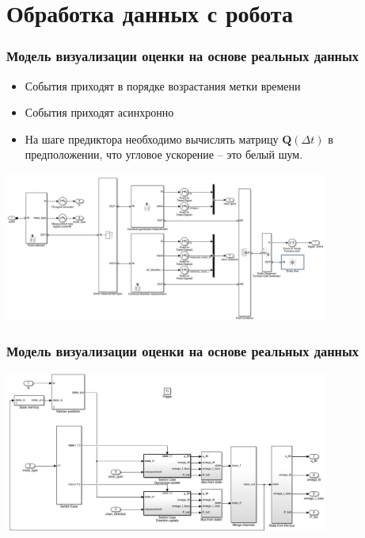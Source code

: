 \documentclass[utf8]{beamer}
\begin{document}
\section{Обработка данных с робота}
\begin{frame}
\frametitle{Модель визуализации оценки на основе реальных данных}
\begin{itemize}
    \item События приходят в порядке возрастания метки времени
    \item События приходят асинхронно
    \item На шаге предиктора необходимо вычислять матрицу
        $\mathbf{Q}\left(\Delta t\right)$ в предположении, что угловое
        ускорение -- это белый шум.
\end{itemize}
\begin{center}
    \includegraphics[width=0.8\textwidth]{pic/event_parser.png}
\end{center}
\end{frame}
\begin{frame}
\frametitle{Модель визуализации оценки на основе реальных данных}
\begin{center}
    \includegraphics[width=0.8\textwidth]{pic/kalman_triggered.png}
\end{center}
\end{frame}
\end{document}
